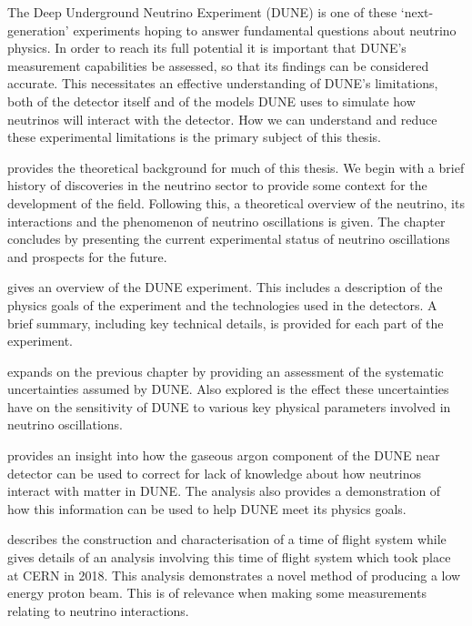 The Deep Underground Neutrino Experiment (DUNE) is one of these `next-generation' experiments hoping to answer fundamental questions about neutrino physics.
In order to reach its full potential it is important that DUNE's measurement capabilities be assessed, so that its findings can be considered accurate.
This necessitates an effective understanding of DUNE's limitations, both of the detector itself and of the models DUNE uses to simulate how neutrinos will interact with the detector.
How we can understand and reduce these experimental limitations is the primary subject of this thesis.

 provides the theoretical background for much of this thesis.
We begin with a brief history of discoveries in the neutrino sector to provide some context for the development of the field.
Following this, a theoretical overview of the neutrino, its interactions and the phenomenon of neutrino oscillations is given.
The chapter concludes by presenting the current experimental status of neutrino oscillations and prospects for the future.

 gives an overview of the DUNE experiment. 
This includes a description of the physics goals of the experiment and the technologies used in the detectors. 
A brief summary, including key technical details, is provided for each part of the experiment.

 expands on the previous chapter by providing an assessment of the systematic uncertainties assumed by DUNE.
Also explored is the effect these uncertainties have on the sensitivity of DUNE to various key physical parameters involved in neutrino oscillations.

 provides an insight into how the gaseous argon component of the DUNE near detector can be used to correct for lack of knowledge about how neutrinos interact with matter in DUNE.
The analysis also provides a demonstration of how this information can be used to help DUNE meet its physics goals.

 describes the construction and characterisation of a time of flight system while  gives details of an analysis involving this time of flight system which took place at CERN in 2018.
This analysis demonstrates a novel method of producing a low energy proton beam.
This is of relevance when making some measurements relating to neutrino interactions.

